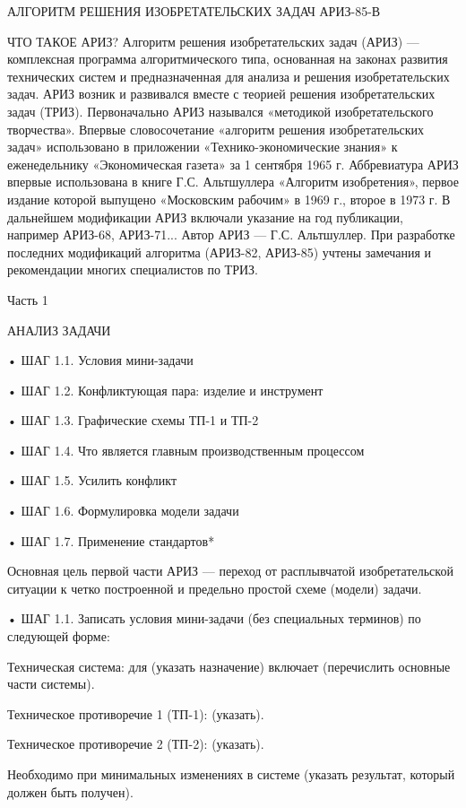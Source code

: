 АЛГОРИТМ РЕШЕНИЯ ИЗОБРЕТАТЕЛЬСКИХ ЗАДАЧ АРИЗ-85-В




ЧТО  ТАКОЕ  АРИЗ? Алгоритм  решения  изобретательских  задач (АРИЗ)  —
комплексная  программа алгоритмического  типа,  основанная на  законах
развития технических  систем и  предназначенная для анализа  и решения
изобретательских  задач. АРИЗ  возник  и развивался  вместе с  теорией
решения  изобретательских задач  (ТРИЗ). Первоначально  АРИЗ назывался
«методикой   изобретательского  творчества».   Впервые  словосочетание
«алгоритм  решения изобретательских  задач» использовано  в приложении
«Технико-экономические знания» к  еженедельнику «Экономическая газета»
за  1  сентября  1965  г. Аббревиатура  АРИЗ  впервые  использована  в
книге Г.С. Альтшуллера «Алгоритм  изобретения», первое издание которой
выпущено «Московским рабочим» в 1969 г., второе в 1973 г. В дальнейшем
модификации  АРИЗ  включали  указание   на  год  публикации,  например
АРИЗ-68,  АРИЗ-71...  Автор АРИЗ  —  Г.С.  Альтшуллер. При  разработке
последних модификаций алгоритма (АРИЗ-82,  АРИЗ-85) учтены замечания и
рекомендации многих специалистов по ТРИЗ.


Часть 1


АНАЛИЗ ЗАДАЧИ

• ШАГ 1.1. Условия мини-задачи

• ШАГ 1.2. Конфликтующая пара: изделие и инструмент

• ШАГ 1.3. Графические схемы ТП-1 и ТП-2

• ШАГ 1.4. Что является главным производственным
процессом

• ШАГ 1.5. Усилить конфликт

• ШАГ 1.6. Формулировка модели задачи

• ШАГ 1.7. Применение стандартов*


Основная   цель  первой   части   АРИЗ  —   переход  от   расплывчатой
изобретательской  ситуации к  четко  построенной  и предельно  простой
схеме (модели) задачи.

• ШАГ 1.1. Записать условия  мини-задачи (без специальных терминов) по
следующей форме:

Техническая  система: для  (указать назначение)  включает (перечислить
основные части системы).

Техническое противоречие 1 (ТП-1): (указать).

Техническое противоречие 2 (ТП-2): (указать).

Необходимо при  минимальных изменениях  в системе  (указать результат,
который должен быть получен).

